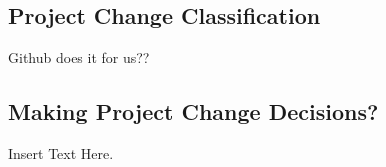 \documentclass [12pt]{article}
\begin{document}
																																																																					\subsection{Project Change Classification}
																																																																					Github does it for us??

																																																																					\subsection{Making Project Change Decisions?} 
																																																																					Insert Text Here.



																																																																					
\end{document}
